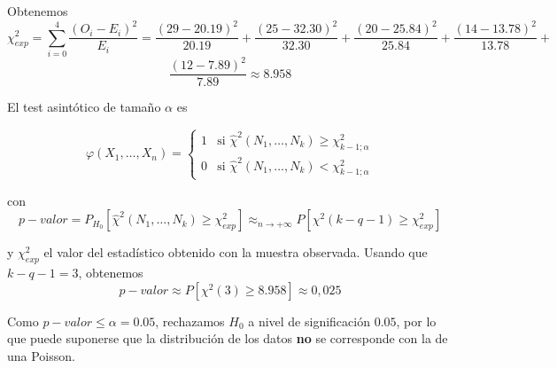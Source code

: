 \documentclass[12pt]{article}
\begin{document}
\begin{ejercicio}[1 punto]
        Obtenemos $$\chi^2_{exp} = \sum_{i=0}^{4} \dfrac{(O_i - E_i)^2}{E_i} = 
        \dfrac{(29 - 20.19)^2}{20.19} + \dfrac{(25 - 32.30)^2}{32.30} +
        \dfrac{(20 - 25.84)^2}{25.84} + \dfrac{(14 - 13.78)^2}{13.78} + $$
        $$\dfrac{(12 - 7.89)^2}{7.89} \approx 8.958$$

        \newpage

        El test asintótico de tamaño $\alpha$ es

        $$\varphi(X_1, \ldots, X_n) = \begin{cases}
            1 &\text{si } \hat{\chi}^2(N_1, \ldots, N_k) \geqslant \chi^2_{k-1;\alpha} \\
            0 &\text{si } \hat{\chi}^2(N_1, \ldots, N_k) < \chi^2_{k-1;\alpha}
        \end{cases}$$

        con $$p-valor = P_{H_0}[\hat{\chi}^2(N_1, \ldots, N_k) \geqslant \chi^2_{exp}] \approx_{n \to +\infty} P[\chi^2(k-q-1) \geqslant \chi^2_{exp}]$$

        y $\chi^2_{exp}$ el valor del estadístico obtenido con la muestra observada. Usando que $k-q-1=3$, obtenemos
        $$p-valor \approx P[\chi^2(3) \geqslant 8.958] \approx 0,025$$

        Como $p-valor \leq \alpha = 0.05$, rechazamos $H_0$ a nivel de significación $0.05$, por lo que puede suponerse que la distribución de los datos 
        \textbf{no} se corresponde con la de una Poisson.
    \end{ejercicio}
\end{document}
